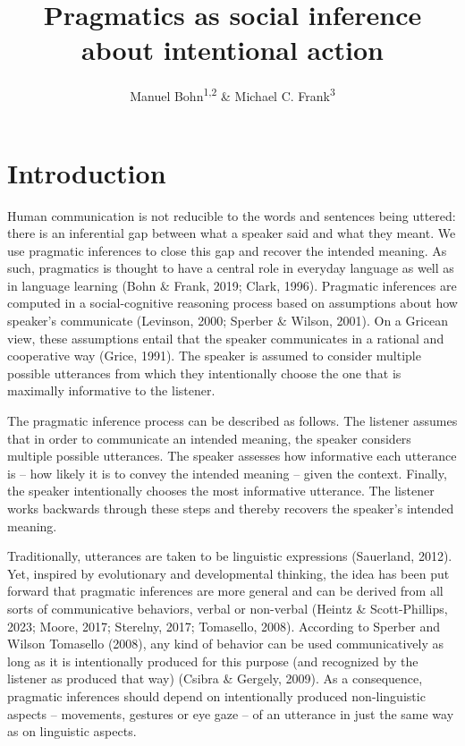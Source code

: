 \documentclass[
  man,floatsintext]{apa6}
\title{Pragmatics as social inference about intentional action}
\author{Manuel Bohn\textsuperscript{1,2} \& Michael C. Frank\textsuperscript{3}}
\date{}
\affiliation{\vspace{0.5cm}\textsuperscript{1} Institute of Psychology in Education, Leuphana University Lüneburg\\\textsuperscript{2} Department of Comparative Cultural Psychology, Max Planck Institute for Evolutionary Anthropology\\\textsuperscript{3} Department of Psychology, Stanford University}
\begin{document}
\maketitle

\hypertarget{introduction}{%
\section{Introduction}\label{introduction}}

Human communication is not reducible to the words and sentences being uttered: there is an inferential gap between what a speaker said and what they meant. We use pragmatic inferences to close this gap and recover the intended meaning. As such, pragmatics is thought to have a central role in everyday language as well as in language learning (Bohn \& Frank, 2019; Clark, 1996). Pragmatic inferences are computed in a social-cognitive reasoning process based on assumptions about how speaker's communicate (Levinson, 2000; Sperber \& Wilson, 2001). On a Gricean view, these assumptions entail that the speaker communicates in a rational and cooperative way (Grice, 1991). The speaker is assumed to consider multiple possible utterances from which they intentionally choose the one that is maximally informative to the listener.

The pragmatic inference process can be described as follows. The listener assumes that in order to communicate an intended meaning, the speaker considers multiple possible utterances. The speaker assesses how informative each utterance is -- how likely it is to convey the intended meaning -- given the context. Finally, the speaker intentionally chooses the most informative utterance. The listener works backwards through these steps and thereby recovers the speaker's intended meaning.

Traditionally, utterances are taken to be linguistic expressions (Sauerland, 2012). Yet, inspired by evolutionary and developmental thinking, the idea has been put forward that pragmatic inferences are more general and can be derived from all sorts of communicative behaviors, verbal or non-verbal (Heintz \& Scott-Phillips, 2023; Moore, 2017; Sterelny, 2017; Tomasello, 2008). According to Sperber and Wilson Tomasello (2008), any kind of behavior can be used communicatively as long as it is intentionally produced for this purpose (and recognized by the listener as produced that way) (Csibra \& Gergely, 2009). As a consequence, pragmatic inferences should depend on intentionally produced non-linguistic aspects -- movements, gestures or eye gaze -- of an utterance in just the same way as on linguistic aspects.
\end{document}
